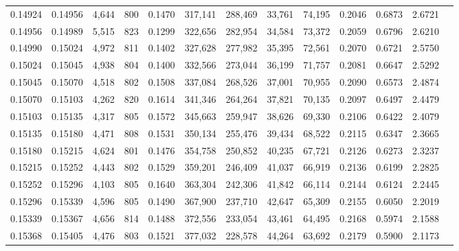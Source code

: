 \begin{tabular}{rrrrrrrrrrrrr}
0.14924 & 0.14956 &  4,644 & 800 &                                     0.1470 & 317,141 & 288,469 &  33,761 &  74,195 & 0.2046 & 0.6873 & 2.6721 \\
0.14956 & 0.14989 &  5,515 & 823 &                                     0.1299 & 322,656 & 282,954 &  34,584 &  73,372 & 0.2059 & 0.6796 & 2.6210 \\
0.14990 & 0.15024 &  4,972 & 811 &                                     0.1402 & 327,628 & 277,982 &  35,395 &  72,561 & 0.2070 & 0.6721 & 2.5750 \\
0.15024 & 0.15045 &  4,938 & 804 &                                     0.1400 & 332,566 & 273,044 &  36,199 &  71,757 & 0.2081 & 0.6647 & 2.5292 \\
0.15045 & 0.15070 &  4,518 & 802 &                                     0.1508 & 337,084 & 268,526 &  37,001 &  70,955 & 0.2090 & 0.6573 & 2.4874 \\
0.15070 & 0.15103 &  4,262 & 820 &                                     0.1614 & 341,346 & 264,264 &  37,821 &  70,135 & 0.2097 & 0.6497 & 2.4479 \\
0.15103 & 0.15135 &  4,317 & 805 &                                     0.1572 & 345,663 & 259,947 &  38,626 &  69,330 & 0.2106 & 0.6422 & 2.4079 \\
0.15135 & 0.15180 &  4,471 & 808 &                                     0.1531 & 350,134 & 255,476 &  39,434 &  68,522 & 0.2115 & 0.6347 & 2.3665 \\
0.15180 & 0.15215 &  4,624 & 801 &                                     0.1476 & 354,758 & 250,852 &  40,235 &  67,721 & 0.2126 & 0.6273 & 2.3237 \\
0.15215 & 0.15252 &  4,443 & 802 &                                     0.1529 & 359,201 & 246,409 &  41,037 &  66,919 & 0.2136 & 0.6199 & 2.2825 \\
0.15252 & 0.15296 &  4,103 & 805 &                                     0.1640 & 363,304 & 242,306 &  41,842 &  66,114 & 0.2144 & 0.6124 & 2.2445 \\
0.15296 & 0.15339 &  4,596 & 805 &                                     0.1490 & 367,900 & 237,710 &  42,647 &  65,309 & 0.2155 & 0.6050 & 2.2019 \\
0.15339 & 0.15367 &  4,656 & 814 &                                     0.1488 & 372,556 & 233,054 &  43,461 &  64,495 & 0.2168 & 0.5974 & 2.1588 \\
0.15368 & 0.15405 &  4,476 & 803 &                                     0.1521 & 377,032 & 228,578 &  44,264 &  63,692 & 0.2179 & 0.5900 & 2.1173 \\

\end{tabular}
